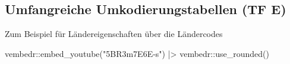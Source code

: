 \documentclass[twoside, pagesize, fontsize=11pt, dvipsnames]{scrreport}
\newenvironment{Shaded}{\begin{snugshade}}{\end{snugshade}}
\newcommand{\FunctionTok}[1]{\textcolor[rgb]{0.28,0.35,0.67}{#1}}
\newcommand{\NormalTok}[1]{\textcolor[rgb]{0.00,0.23,0.31}{#1}}
\newcommand{\SpecialCharTok}[1]{\textcolor[rgb]{0.37,0.37,0.37}{#1}}
\newcommand{\StringTok}[1]{\textcolor[rgb]{0.13,0.47,0.30}{#1}}
\begin{document}
\hypertarget{umfangreiche-umkodierungstabellen-tf-e}{%
\subsection{Umfangreiche Umkodierungstabellen (TF
E)}\label{umfangreiche-umkodierungstabellen-tf-e}}

Zum Beispiel für Ländereigenschaften über die Ländercodes

\begin{Shaded}
\begin{Highlighting}[]
\NormalTok{vembedr}\SpecialCharTok{::}\FunctionTok{embed\_youtube}\NormalTok{(}\StringTok{"5BR3m7E6E{-}s"}\NormalTok{) }\SpecialCharTok{|\textgreater{}} 
\NormalTok{  vembedr}\SpecialCharTok{::}\FunctionTok{use\_rounded}\NormalTok{()}
\end{Highlighting}
\end{Shaded}
\end{document}
